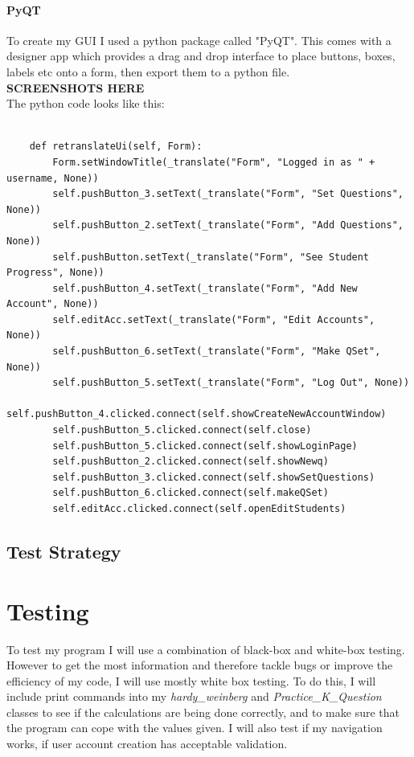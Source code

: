 \documentclass[a4paper,12pt]{report}
\begin{document}
\subsubsection{PyQT}
To create my GUI I used a python package called "PyQT". This comes with a designer app which provides a drag and drop interface to place buttons, boxes, labels etc onto a form, then export them to a python file.\\
\textbf{SCREENSHOTS HERE}\\
The python code looks like this:
\begin{lstlisting}[style=customc]

    def retranslateUi(self, Form):
        Form.setWindowTitle(_translate("Form", "Logged in as " + username, None))
        self.pushButton_3.setText(_translate("Form", "Set Questions", None))
        self.pushButton_2.setText(_translate("Form", "Add Questions", None))
        self.pushButton.setText(_translate("Form", "See Student Progress", None))
        self.pushButton_4.setText(_translate("Form", "Add New Account", None))
        self.editAcc.setText(_translate("Form", "Edit Accounts", None))
        self.pushButton_6.setText(_translate("Form", "Make QSet", None))
        self.pushButton_5.setText(_translate("Form", "Log Out", None))
        self.pushButton_4.clicked.connect(self.showCreateNewAccountWindow)
        self.pushButton_5.clicked.connect(self.close)
        self.pushButton_5.clicked.connect(self.showLoginPage)
        self.pushButton_2.clicked.connect(self.showNewq)
        self.pushButton_3.clicked.connect(self.showSetQuestions)
        self.pushButton_6.clicked.connect(self.makeQSet)
        self.editAcc.clicked.connect(self.openEditStudents)
\end{lstlisting}
\bigskip
\FloatBarrier

\section{Test Strategy}


\chapter{Testing}
To test my program I will use a combination of black-box and white-box testing. However to get the most information and therefore tackle bugs or improve the efficiency of my code, I will use mostly white box testing. To do this, I will include print commands into my \emph{hardy\_{}weinberg} and \emph{Practice\_{}K\_{}Question} classes to see if the calculations are being done correctly, and to make sure that the program can cope with the values given. I will also test if my navigation works, if user account creation has acceptable validation.
\end{document}
